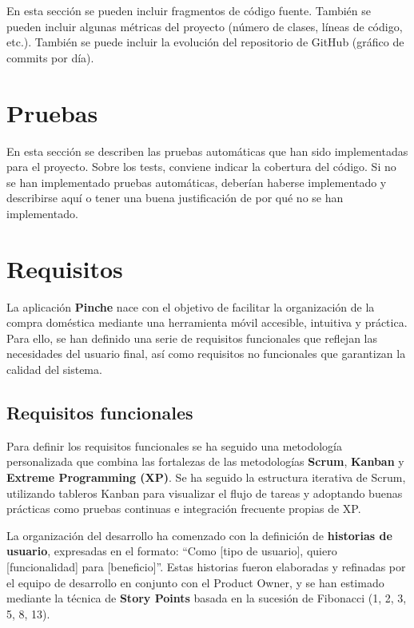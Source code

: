 En esta sección se pueden incluir fragmentos de código fuente. También se pueden incluir algunas métricas del proyecto (número de clases, líneas de código, etc.). También se puede incluir la evolución del repositorio de GitHub (gráfico de commits por día).

\section{Pruebas}
\label{sec:pruebas}

En esta sección se describen las pruebas automáticas que han sido implementadas para el proyecto. Sobre los tests, conviene indicar la cobertura del código. Si no se han implementado pruebas automáticas, deberían haberse implementado y describirse aquí o tener una buena justificación de por qué no se han implementado.


\section{Requisitos}
\label{sec:requisitos}

La aplicación \textbf{Pinche} nace con el objetivo de facilitar la organización de la compra doméstica mediante una herramienta móvil accesible, intuitiva y práctica. Para ello, se han definido una serie de requisitos funcionales que reflejan las necesidades del usuario final, así como requisitos no funcionales que garantizan la calidad del sistema.

\subsection{Requisitos funcionales}

Para definir los requisitos funcionales se ha seguido una metodolog\'ia personalizada que combina las fortalezas de las metodolog\'ias \textbf{Scrum}, \textbf{Kanban} y \textbf{Extreme Programming (XP)}. Se ha seguido la estructura iterativa de Scrum, utilizando tableros Kanban para visualizar el flujo de tareas y adoptando buenas pr\'acticas como pruebas continuas e integraci\'on frecuente propias de XP.

La organizaci\'on del desarrollo ha comenzado con la definici\'on de \textbf{historias de usuario}, expresadas en el formato: ``Como [tipo de usuario], quiero [funcionalidad] para [beneficio]''. Estas historias fueron elaboradas y refinadas por el equipo de desarrollo en conjunto con el Product Owner, y se han estimado mediante la t\'ecnica de \textbf{Story Points} basada en la sucesi\'on de Fibonacci (1, 2, 3, 5, 8, 13).

